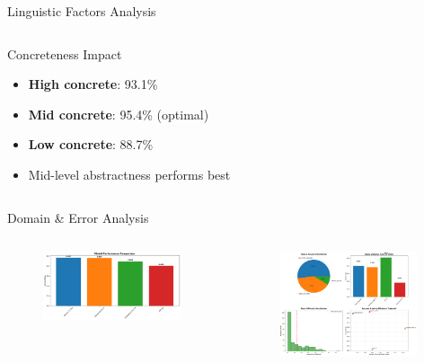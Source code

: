 \documentclass[aspectratio=169]{beamer}
\begin{document}
\begin{frame}{Linguistic Factors Analysis}
\begin{columns}
\begin{column}{0.5\textwidth}
\begin{block}{Concreteness Impact}
\begin{itemize}
    \item \textbf{High concrete}: 93.1\%
    \item \textbf{Mid concrete}: 95.4\% (optimal)
    \item \textbf{Low concrete}: 88.7\%
    \item Mid-level abstractness performs best
\end{itemize}
\end{block}
\end{column}
\end{columns}
\end{frame}

\begin{frame}{Domain \& Error Analysis}
\begin{columns}
\begin{column}{0.5\textwidth}
\begin{figure}[h]
\centering
\includegraphics[width=0.95\textwidth]{comprehensive_figures/figure5_domain.png}
\end{figure}
\end{column}

\begin{column}{0.5\textwidth}
\begin{figure}[h]
\centering
\includegraphics[width=0.95\textwidth]{comprehensive_figures/figure6_error_analysis.png}
\end{figure}
\end{column}
\end{columns}


\end{frame}
\end{document}
